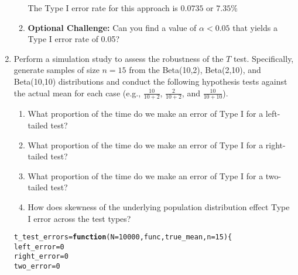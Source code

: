 \documentclass{article}\usepackage[]{graphicx}\usepackage[]{xcolor}
\makeatletter
\newcommand{\hlnum}[1]{\textcolor[rgb]{0.686,0.059,0.569}{#1}}%
\newcommand{\hldef}[1]{\textcolor[rgb]{0.345,0.345,0.345}{#1}}%
\newcommand{\hlkwa}[1]{\textcolor[rgb]{0.161,0.373,0.58}{\textbf{#1}}}%
\newcommand{\hlkwb}[1]{\textcolor[rgb]{0.69,0.353,0.396}{#1}}%
\newcommand{\hlkwc}[1]{\textcolor[rgb]{0.333,0.667,0.333}{#1}}%
\newenvironment{kframe}{%
 \def\at@end@of@kframe{}%
 \ifinner\ifhmode%
  \def\at@end@of@kframe{\end{minipage}}%
  \begin{minipage}{\columnwidth}%
 \fi\fi%
 \def\FrameCommand##1{\hskip\@totalleftmargin \hskip-\fboxsep
 \colorbox{shadecolor}{##1}\hskip-\fboxsep
     \hskip-\linewidth \hskip-\@totalleftmargin \hskip\columnwidth}%
 \MakeFramed {\advance\hsize-\width
   \@totalleftmargin\z@ \linewidth\hsize
   \@setminipage}}%
 {\par\unskip\endMakeFramed%
 \at@end@of@kframe}
\newenvironment{knitrout}{}{} %
\makeatother
\begin{document}
\begin{enumerate}
\begin{enumerate}
  The Type I error rate for this approach is $0.0735$ or $7.35\%$
  
  \item \textbf{Optional Challenge:} Can you find a value of $\alpha<0.05$ that yields a 
  Type I error rate of 0.05?
\end{enumerate}
  \item Perform a simulation study to assess the robustness of the $T$ test. 
  Specifically, generate samples of size $n=15$ from the Beta(10,2), Beta(2,10), 
  and Beta(10,10) distributions and conduct the following hypothesis tests against 
  the actual mean for each case (e.g., $\frac{10}{10+2}$, $\frac{2}{10+2}$, and 
  $\frac{10}{10+10}$). 
  \begin{enumerate}
    \item What proportion of the time do we make an error of Type I for a
    left-tailed test?
    \item What proportion of the time do we make an error of Type I for a
    right-tailed test?
    \item What proportion of the time do we make an error of Type I for a
    two-tailed test?
    \item How does skewness of the underlying population distribution effect
    Type I error across the test types?
  \end{enumerate}
  
\begin{knitrout}
\color{fgcolor}\begin{kframe}
\begin{alltt}
\hldef{t_test_errors} \hlkwb{=} \hlkwa{function}\hldef{(}\hlkwc{N} \hldef{=} \hlnum{10000}\hldef{,} \hlkwc{func}\hldef{,} \hlkwc{true_mean}\hldef{,} \hlkwc{n} \hldef{=} \hlnum{15}\hldef{)\{}
  \hldef{left_error} \hlkwb{=} \hlnum{0}
  \hldef{right_error} \hlkwb{=} \hlnum{0}
  \hldef{two_error} \hlkwb{=} \hlnum{0}


\end{alltt}
\end{kframe}
\end{knitrout}
\end{enumerate}
\end{document}
